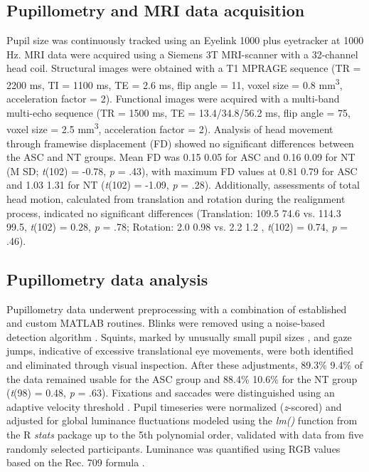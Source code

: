 \subsection{Pupillometry and MRI data acquisition}
Pupil size was continuously tracked using an Eyelink 1000 plus eyetracker at 1000 Hz. MRI data were acquired using a Siemens 3T MRI-scanner with a 32-channel head coil. Structural images were obtained with a T1 MPRAGE sequence (TR = 2200 ms, TI = 1100 ms, TE = 2.6 ms, flip angle = 11\textdegree, 
voxel size = 0.8 mm\textsuperscript{3}, acceleration factor = 2). Functional images were acquired with a multi-band multi-echo sequence (TR = 1500 ms, TE = 13.4/34.8/56.2 ms, flip angle = 75\textdegree, voxel size = 2.5 mm\textsuperscript{3}, acceleration factor = 2). Analysis of head movement through framewise displacement (FD) showed no significant differences between the ASC and NT groups. Mean FD was 0.15 \textpm{}{} 0.05 for ASC and 0.16 \textpm{}{} 0.09 for NT (M \textpm{} SD; \textit{t}(102) = -0.78, \textit{p} = .43), with maximum FD values at 0.81 \textpm{} 0.79 for ASC and 1.03 \textpm{} 1.31 for NT (\textit{t}(102) = -1.09, \textit{p} = .28). Additionally, assessments of total head motion, calculated from translation and rotation during the realignment process, indicated no significant differences (Translation: 109.5 \textpm{} 74.6 vs. 114.3 \textpm{} 99.5, \textit{t}(102) = 0.28, \textit{p} = .78; Rotation: 2.0 \textpm{} 0.98 vs. 2.2 \textpm{} 1.2 , \textit{t}(102) = 0.74, \textit{p} = .46).

\subsection{Pupillometry data analysis}
Pupillometry data underwent preprocessing with a combination of established and custom MATLAB routines. Blinks were removed using a noise-based detection algorithm \citep{hershman2018}. Squints, marked by unusually small pupil sizes \citep{mathot2018}, and gaze jumps, indicative of excessive translational eye movements, were both identified and eliminated through visual inspection. After these adjustments, 89.3\% \textpm{} 9.4\% of the data remained usable for the ASC group and 88.4\% \textpm{} 10.6\% for the NT group (\textit{t}(98) = 0.48, \textit{p} = .63). Fixations and saccades were distinguished using an adaptive velocity threshold \citep{nystrom2010}. Pupil timeseries were normalized (\textit{z}-scored) and adjusted for global luminance fluctuations modeled using the \textit{lm()} function from the R \textit{stats} package \citep{bates2015} up to the 5th polynomial order, validated with data from five randomly selected participants. Luminance was quantified using RGB values based on the Rec. 709 formula \citep{itu2002}. 

